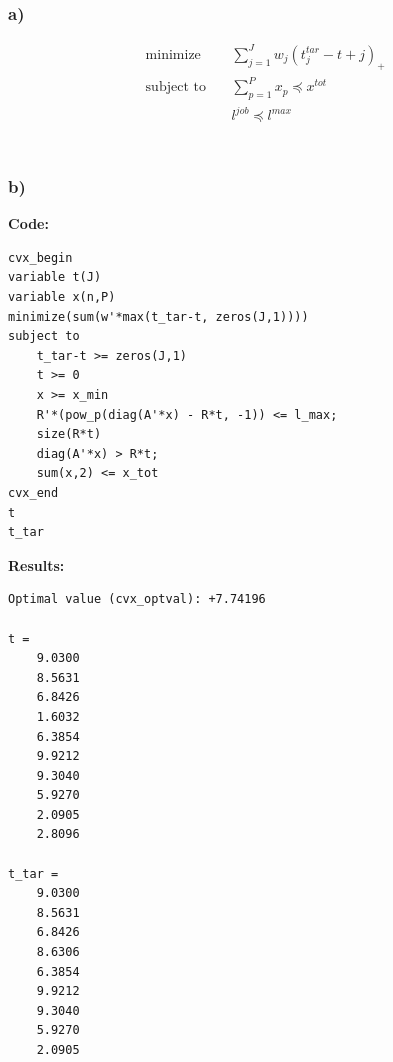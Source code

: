 \documentclass[12pt]{article}
\begin{document}
\subsubsection*{a)}
\begin{equation*}
\begin{aligned}
& \underset{}{\text{minimize}}
& & \sum_{j=1}^{J}w_j(t_j^{tar}-t+j)_+\\
& \text{subject to}\
& & \sum_{p=1}^{P}x_p \preceq x^{tot}\\
&&& l^{job} \preceq l^{max}\\
\end{aligned}
\end{equation*}\\
\subsubsection*{b)}
\textbf{Code:}\\
\begin{lstlisting}
cvx_begin
variable t(J)
variable x(n,P)
minimize(sum(w'*max(t_tar-t, zeros(J,1))))
subject to
    t_tar-t >= zeros(J,1)
    t >= 0
    x >= x_min
    R'*(pow_p(diag(A'*x) - R*t, -1)) <= l_max;
    size(R*t)
    diag(A'*x) > R*t;
    sum(x,2) <= x_tot
cvx_end
t
t_tar
\end{lstlisting}
\textbf{Results:}
\begin{verbatim}
Optimal value (cvx_optval): +7.74196

t =
    9.0300
    8.5631
    6.8426
    1.6032
    6.3854
    9.9212
    9.3040
    5.9270
    2.0905
    2.8096

t_tar =
    9.0300
    8.5631
    6.8426
    8.6306
    6.3854
    9.9212
    9.3040
    5.9270
    2.0905
\end{verbatim}
 
\end{document}
